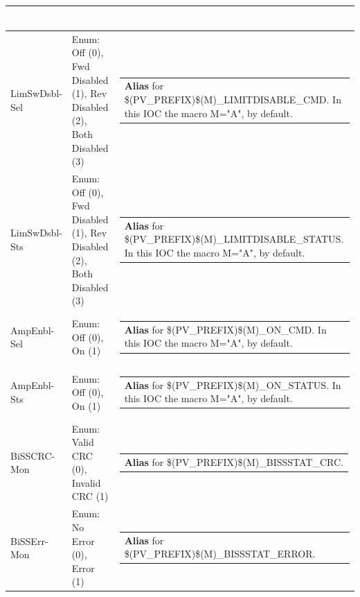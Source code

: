 \documentclass[openany]{article}
\begin{document}
\begin{longtable}{| m{4.5cm} m{2.5cm}  m{8.5cm} |}
\begin{tabular}{@{}m{6cm}@{}}
            \end{tabular} \hypertarget{pv:lim-sw-dsbl}{}\\ \hline
        LimSwDsbl-Sel & Enum: Off (0), Fwd Disabled (1), Rev Disabled (2), Both Disabled (3) & \begin{tabular}{@{}m{6cm}@{}}
                \textbf{\color{blue} Alias} for \$(PV\_PREFIX)\$(M)\_LIMITDISABLE\_CMD. In this IOC the macro M="A", by default.
            \end{tabular} \hypertarget{}{}\\ \hline
        LimSwDsbl-Sts & Enum: Off (0), Fwd Disabled (1), Rev Disabled (2), Both Disabled (3) & \begin{tabular}{@{}m{6cm}@{}}
                \textbf{\color{blue} Alias} for \$(PV\_PREFIX)\$(M)\_LIMITDISABLE\_STATUS. In this IOC the macro M="A", by default.
            \end{tabular} \hypertarget{pv:amp-enbl}{}\\ \hline
        AmpEnbl-Sel & Enum: Off (0), On (1) & \begin{tabular}{@{}m{6cm}@{}}
                \textbf{\color{blue} Alias} for \$(PV\_PREFIX)\$(M)\_ON\_CMD. In this IOC the macro M="A", by default.
            \end{tabular} \hypertarget{}{}\\ \hline
        AmpEnbl-Sts & Enum: Off (0), On (1) & \begin{tabular}{@{}m{6cm}@{}}
                \textbf{\color{blue} Alias} for \$(PV\_PREFIX)\$(M)\_ON\_STATUS. In this IOC the macro M="A", by default.
            \end{tabular} \hypertarget{pv:biss-crc-mon}{}\\ \hline
        BiSSCRC-Mon & Enum: Valid CRC (0), Invalid CRC (1) & \begin{tabular}{@{}m{6cm}@{}}
                \textbf{\color{blue} Alias} for \$(PV\_PREFIX)\$(M)\_BISSSTAT\_CRC.
            \end{tabular} \hypertarget{pv:biss-err-mon}{}\\ \hline
        BiSSErr-Mon & Enum: No Error (0), Error (1) & \begin{tabular}{@{}m{6cm}@{}}
                \textbf{\color{blue} Alias} for \$(PV\_PREFIX)\$(M)\_BISSSTAT\_ERROR.
            \end{tabular} \hypertarget{pv:biss-poll}{}\\ \hline

\end{longtable}
\end{document}
